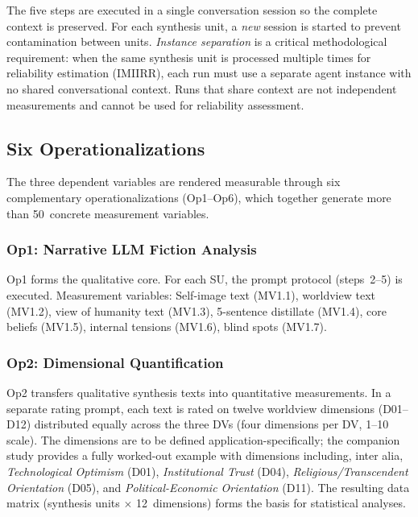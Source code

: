 \documentclass[11pt,a4paper]{article}
\theoremstyle{definition}
\theoremstyle{plain}
\theoremstyle{remark}
\begin{document}
The five steps are executed in a single conversation session so the complete context is preserved. For each synthesis unit, a \emph{new} session is started to prevent contamination between units. \emph{Instance separation} is a critical methodological requirement: when the same synthesis unit is processed multiple times for reliability estimation (IMIIRR), each run must use a separate agent instance with no shared conversational context. Runs that share context are not independent measurements and cannot be used for reliability assessment.


\subsection{Six Operationalizations}

The three dependent variables are rendered measurable through six complementary operationalizations (Op1--Op6), which together generate more than 50~concrete measurement variables.

\subsubsection{Op1: Narrative LLM Fiction Analysis}

Op1 forms the qualitative core. For each SU, the prompt protocol (steps~2--5) is executed. Measurement variables: Self-image text (MV1.1), worldview text (MV1.2), view of humanity text (MV1.3), 5-sentence distillate (MV1.4), core beliefs (MV1.5), internal tensions (MV1.6), blind spots (MV1.7).

\subsubsection{Op2: Dimensional Quantification}

Op2 transfers qualitative synthesis texts into quantitative measurements. In a separate rating prompt, each text is rated on twelve worldview dimensions (D01--D12) distributed equally across the three DVs (four dimensions per DV, 1--10 scale). The dimensions are to be defined application-specifically; the companion study \citep{Geiger2026b} provides a fully worked-out example with dimensions including, inter alia, \emph{Technological Optimism} (D01), \emph{Institutional Trust} (D04), \emph{Religious/Transcendent Orientation} (D05), and \emph{Political-Economic Orientation} (D11). The resulting data matrix (synthesis units $\times$ 12~dimensions) forms the basis for statistical analyses.
\end{document}
